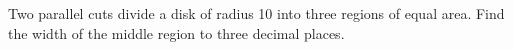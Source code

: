 Two parallel cuts divide a disk of radius 10 into three regions of equal area. Find the width of the middle region to three decimal places.
